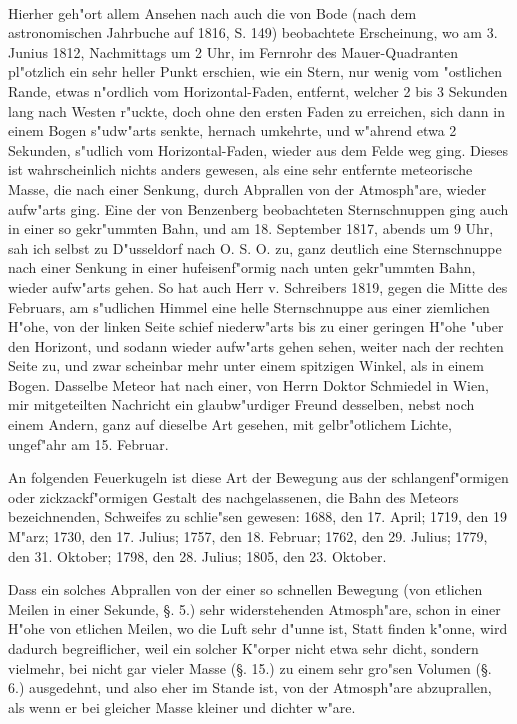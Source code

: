 \documentclass[a4paper, 11pt, oneside, polutonikogreek, german]{article}
\begin{document}
\paragraph{}
Hierher geh"ort allem Ansehen nach auch die von Bode (nach dem astronomischen Jahrbuche auf 1816, S. 149) beobachtete Erscheinung, wo am 3. Junius 1812, Nachmittags um 2 Uhr, im Fernrohr des Mauer-Quadranten pl"otzlich ein sehr heller Punkt erschien, wie ein Stern, nur wenig vom "ostlichen Rande, etwas n"ordlich vom Horizontal-Faden, entfernt, welcher 2 bis 3 Sekunden lang nach Westen r"uckte, doch ohne den ersten Faden zu erreichen, sich dann in einem Bogen s"udw"arts senkte, hernach umkehrte, und w"ahrend etwa 2 Sekunden, s"udlich vom Horizontal-Faden, wieder aus dem Felde weg ging. Dieses ist wahrscheinlich nichts anders gewesen, als eine sehr entfernte meteorische Masse, die nach einer Senkung, durch Abprallen von der Atmosph"are, wieder aufw"arts ging. Eine der von Benzenberg beobachteten Sternschnuppen ging auch in einer so gekr"ummten Bahn, und am 18. September 1817, abends um 9 Uhr, sah ich selbst zu D"usseldorf nach O. S. O. zu, ganz deutlich eine Sternschnuppe nach einer Senkung in einer hufeisenf"ormig nach unten gekr"ummten Bahn, wieder aufw"arts gehen. So hat auch Herr v. Schreibers 1819, gegen die Mitte des Februars, am s"udlichen Himmel eine helle Sternschnuppe aus einer ziemlichen H"ohe, von der linken Seite schief niederw"arts bis zu einer geringen H"ohe "uber den Horizont, und sodann wieder aufw"arts gehen sehen, weiter nach der rechten Seite zu, und zwar scheinbar mehr unter einem spitzigen Winkel, als in einem Bogen. Dasselbe Meteor hat nach einer, von Herrn Doktor Schmiedel in Wien, mir mitgeteilten Nachricht ein glaubw"urdiger Freund desselben, nebst noch einem Andern, ganz auf dieselbe Art gesehen, mit gelbr"otlichem Lichte, ungef"ahr am 15. Februar.

An folgenden Feuerkugeln ist diese Art der Bewegung aus der schlangenf"ormigen oder zickzackf"ormigen Gestalt des nachgelassenen, die Bahn des Meteors bezeichnenden, Schweifes zu schlie"sen gewesen: 1688, den 17. April; 1719, den 19 M"arz; 1730, den 17. Julius; 1757, den 18. Februar; 1762, den 29. Julius; 1779, den 31. Oktober; 1798, den 28. Julius; 1805, den 23. Oktober.

Dass ein solches Abprallen von der einer so schnellen Bewegung (von etlichen Meilen in einer Sekunde, §. 5.) sehr widerstehenden Atmosph"are, schon in einer H"ohe von etlichen Meilen, wo die Luft sehr d"unne ist, Statt finden k"onne, wird dadurch begreiflicher, weil ein solcher K"orper nicht etwa sehr dicht, sondern vielmehr, bei nicht gar vieler Masse (§. 15.) zu einem sehr gro"sen Volumen (§. 6.) ausgedehnt, und also eher im Stande ist, von der Atmosph"are abzuprallen, als wenn er bei gleicher Masse kleiner und dichter w"are.
\end{document}
